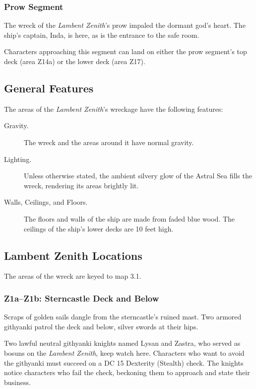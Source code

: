 \documentclass[10pt,a4paper,twoside,bg=print,twocolumn,openany,nodeprecatedcode]{dndbook}
\begin{document}
\subsubsection{Prow Segment}
The wreck of the \textit{Lambent Zenith}'s prow impaled the dormant god's heart. The ship's captain, Inda, is here, as is the entrance to the safe room.

Characters approaching this segment can land on either the prow segment's top deck (area Z14a) or the lower deck (area Z17).

\subsection{General Features}
The areas of the \textit{Lambent Zenith}'s wreckage have the following features:


\begin{description}
\item[Gravity.]
The wreck and the areas around it have normal gravity.
\item[Lighting.]
Unless otherwise stated, the ambient silvery glow of the Astral Sea fills the wreck, rendering its areas brightly lit.
\item[Walls, Ceilings, and Floors.]
The floors and walls of the ship are made from faded blue wood. The ceilings of the ship's lower decks are 10 feet high.
\end{description}

\subsection{Lambent Zenith Locations}
The areas of the wreck are keyed to map 3.1.

\subsubsection{Z1a–Z1b: Sterncastle Deck and Below}
\begin{DndReadAloud}{}
Scraps of golden sails dangle from the sterncastle's ruined mast. Two armored githyanki patrol the deck and below, silver swords at their hips.

\end{DndReadAloud}

Two lawful neutral githyanki knights named Lysan and Zastra, who served as bosuns on the \textit{Lambent Zenith}, keep watch here. Characters who want to avoid the githyanki must succeed on a DC 15 Dexterity (Stealth) check. The knights notice characters who fail the check, beckoning them to approach and state their business.
\end{document}
